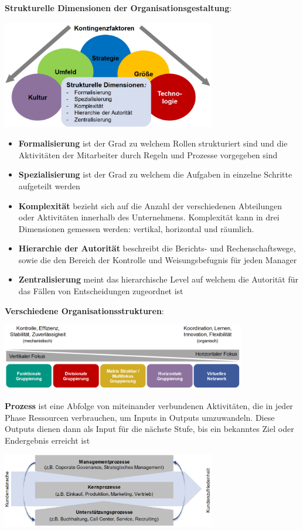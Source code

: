 \textbf{Strukturelle Dimensionen der Organisationsgestaltung}:
\begin{center}
	\includegraphics[width=0.7\textwidth]{images/organisationsgestaltung.png}
\end{center}
\begin{itemize}
	\item \textbf{Formalisierung} ist der Grad zu welchem Rollen strukturiert sind und die Aktivitäten der Mitarbeiter durch Regeln und Prozesse vorgegeben sind
	\item \textbf{Spezialisierung} ist der Grad zu welchem die Aufgaben in einzelne Schritte aufgeteilt werden 
	\item \textbf{Komplexität} bezieht sich auf die Anzahl der verschiedenen Abteilungen oder Aktivitäten innerhalb des Unternehmens. Komplexität kann in drei Dimensionen gemessen werden: vertikal, horizontal und räumlich.
	\item \textbf{Hierarchie der Autorität} beschreibt die Berichts- und Rechenschaftswege, sowie die den Bereich der Kontrolle und Weisungsbefugnis für jeden Manager
	\item \textbf{Zentralisierung} meint das hierarchische Level auf welchem die Autorität für das Fällen von Entscheidungen zugeordnet ist
\end{itemize}

\pagebreak
\textbf{Verschiedene Organisationsstrukturen}:
\begin{center}
	\includegraphics[width=0.8\textwidth]{images/organisationsstrukturen.png}
\end{center}

\textbf{Prozess} ist eine Abfolge von  miteinander verbundenen Aktivitäten, die in jeder Phase Ressourcen verbrauchen, um Inputs in Outputs umzuwandeln. Diese Outputs dienen dann als Input für die nächste Stufe, bis ein
bekanntes Ziel oder Endergebnis erreicht ist
\begin{center}
	\includegraphics[width=0.7\textwidth]{images/prozess.png}
\end{center}

